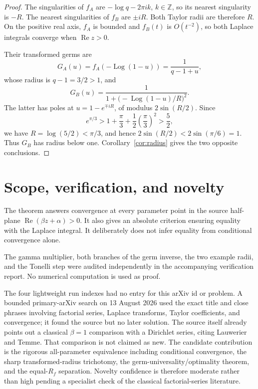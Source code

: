\documentclass[11pt]{article}
\newcommand{\Log}{\operatorname{Log}}
\begin{document}
\begin{proof}
The singularities of $f_A$ are
$-\log q-2\pi i k$, $k\in\mathbb Z$, so its nearest singularity is $-R$.
The nearest singularities of $f_B$ are $\pm iR$.  Both Taylor radii are
therefore $R$.  On the positive real axis, $f_A$ is bounded and $f_B(t)$ is
$O(t^{-2})$, so both Laplace integrals converge when
$\operatorname{Re}z>0$.

Their transformed germs are
\[
 G_A(u)=f_A(-\Log(1-u))=\frac1{q-1+u},
\]
whose radius is $q-1=3/2>1$, and
\[
 G_B(u)=\frac1{1+\bigl(-\Log(1-u)/R\bigr)^2}.
\]
The latter has poles at $u=1-e^{\mp iR}$, of modulus
$2\sin(R/2)$.  Since
\[
 e^{\pi/3}>1+\frac\pi3+\frac12\left(\frac\pi3\right)^2>\frac52,
\]
we have $R=\log(5/2)<\pi/3$, and hence
$2\sin(R/2)<2\sin(\pi/6)=1$.  Thus $G_B$ has radius below one.
Corollary~\ref{cor:radius} gives the two opposite conclusions.
\end{proof}

\section{Scope, verification, and novelty}

The theorem answers convergence at every parameter point in the source
half-plane $\operatorname{Re}(\beta z+\alpha)>0$.  It also gives an absolute
criterion ensuring equality with the Laplace integral.  It deliberately does
not infer equality from conditional convergence alone.

The gamma multiplier, both branches of the germ inverse, the two example
radii, and the Tonelli step were audited independently in the accompanying
verification report.  No numerical computation is used as proof.

The four lightweight run indexes had no entry for this arXiv id or problem.
A bounded primary-arXiv search on 13 August 2026 used the exact title and close
phrases involving factorial series, Laplace transforms, Taylor coefficients,
and convergence; it found the source but no later solution.  The source itself
already points out a classical $\beta=1$ comparison with a Dirichlet series,
citing Lauwerier and Temme.  That comparison is not claimed as new.  The
candidate contribution is the rigorous all-parameter equivalence including
conditional convergence, the sharp transformed-radius trichotomy, the
germ-universality/optimality theorem, and the equal-$R_f$ separation.  Novelty
confidence is therefore moderate rather than high pending a specialist check
of the classical factorial-series literature.
\end{document}
